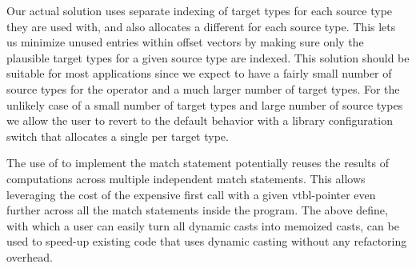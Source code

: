 Our actual solution uses separate indexing of target types for each source type 
they are used with, and also allocates a different 
 for each source type. This lets us 
minimize unused entries within offset vectors by making sure only the plausible 
target types for a given source type are indexed. This solution should be 
suitable for most applications since we expect to have a fairly small 
number of source types for the  operator and a much larger number 
of target types. For the unlikely case of a small number of target types and large 
number of source types we allow the user to revert to the default behavior with a 
library configuration switch that allocates a single  per target type.

The use of  to implement the match statement potentially reuses the 
results of  computations across multiple independent match 
statements. This allows leveraging the cost of the expensive first call with a 
given vtbl-pointer even further across all the match statements inside the 
program. The above define, with which a user can easily turn all dynamic casts 
into memoized casts, can be used to speed-up existing code that uses dynamic 
casting without any refactoring overhead.
